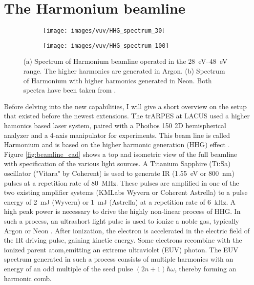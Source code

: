 \section{The Harmonium beamline}

\begin{figure}
	\centering
	\begin{subfigure}[b]{0.45\textwidth}
		\texttt{[image: images/vuv/HHG\_spectrum\_30]}
		\caption{}
	\end{subfigure}
	\begin{subfigure}[b]{0.45\textwidth}
		\texttt{[image: images/vuv/HHG\_spectrum\_100]}
		\caption{}
	\end{subfigure}
	\caption{(a) Spectrum of Harmonium beamline operated in the \qtyrange{28}{48}{\electronvolt} range. The higher harmonics are generated in Argon. (b) Spectrum of Harmonium with higher harmonics generated in Neon. Both spectra have been taken from \cite{ojeda_harmonium_2015}.}
	\label{fig:hhgspectrum}
\end{figure}


Before delving into the new capabilities, I will give a short overview on the setup that existed before the newest extensions.
The trARPES at LACUS used a higher hamonics based laser system, paired with a Phoibos 150 2D hemispherical analyzer and a 4-axis manipulator for experiments.
This beam line is called Harmonium and is based on the higher harmonic generation (HHG) effect \cite{arrell_harmonium_2017}.
Figure \ref{fig:beamline_cad} shows a top and isometric view of the full beamline with specification of the various light sources.
A Titanium Sapphire (Ti:Sa) oscillator ("Vitara" by Coherent) is used to generate IR (\qty{1.55}{\electronvolt} or \qty{800}{\nano\meter}) pulses at a repetition rate of \qty{80}{\mega\hertz}.
These pulses are amplified in one of the two existing amplifier systems (KMLabs Wyvern or Coherent Astrella) to a pulse energy of \qty{2}{\milli\joule} (Wyvern) or \qty{1}{\milli\joule} (Astrella) at a repetition rate of \qty{6}{\kilo\hertz}.
A high peak power is necessary to drive the highly non-linear process of HHG.
In such a process, an ultrashort light pulse is used to ionize a noble gas, typically Argon or Neon \cite{rudawski_high-flux_2013}.
After ionization, the electron is accelerated in the electric field of the IR driving pulse, gaining kinetic energy.
Some electrons recombine with the ionized parent atom,emitting an extreme ultraviolet (EUV) photon.
The EUV spectrum generated in such a process consists of multiple harmonics with an energy of an odd multiple of the seed pulse $(2n+1) \hbar\omega$, thereby forming an harmonic comb.

